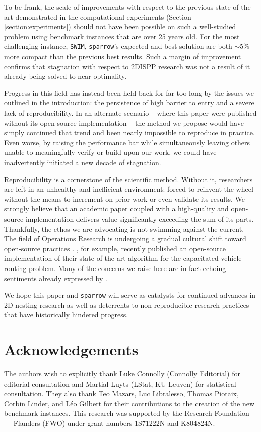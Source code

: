 \documentclass[preprint, 11pt, authoryear]{elsarticle}
\begin{document}
To be frank, the scale of improvements with respect to the previous state of the art demonstrated in the computational experiments (Section \ref{section:experiments}) should not have been possible on such a well-studied problem using benchmark instances that are over 25 years old.
For the most challenging instance, \texttt{SWIM}, \texttt{sparrow}'s expected and best solution are both $\sim$5\% more compact than the previous best results.
Such a margin of improvement confirms that stagnation with respect to 2DISPP research was not a result of it already being solved to near optimality.

Progress in this field has instead been held back for far too long by the issues we outlined in the introduction: the persistence of high barrier to entry and a severe lack of reproducibility.
In an alternate scenario -- where this paper were published without its open-source implementation -- the method we propose would have simply continued that trend and been nearly impossible to reproduce in practice.
Even worse, by raising the performance bar while simultaneously leaving others unable to meaningfully verify or build upon our work, we could have inadvertently initiated a new decade of stagnation.

Reproducibility is a cornerstone of the scientific method.
Without it, researchers are left in an unhealthy and inefficient environment: forced to reinvent the wheel without the means to increment on prior work or even validate its results.
We strongly believe that an academic paper coupled with a high-quality and open-source implementation delivers value significantly exceeding the sum of its parts.
Thankfully, the ethos we are advocating is not swimming against the current. 
The field of Operations Research is undergoing a gradual cultural shift toward open-source practices \citep{petropoulos2024operational}. 
\citet{vidal2022hybrid}, for example, recently published an open-source implementation of their state-of-the-art algorithm for the capacitated vehicle routing problem.
Many of the concerns we raise here are in fact echoing sentiments already expressed by \citet{vidal2022hybrid}.

We hope this paper and \texttt{sparrow} will serve as catalysts for continued advances in 2D nesting research as well as deterrents to non-reproducible research practices that have historically hindered progress.

\section*{Acknowledgements}
The authors wish to explicitly thank Luke Connolly (Connolly Editorial) for editorial consultation and Martial Luyts (LStat, KU Leuven) for statistical consultation.
They also thank Teo Mazars, Luc Libralesso, Thomas Piotaix, Corbin Linder, and Léo Gilbert for their contributions to the creation of the new benchmark instances.
This research was supported by the Research Foundation — Flanders (FWO) under grant numbers 1S71222N and K804824N.


\end{document}
